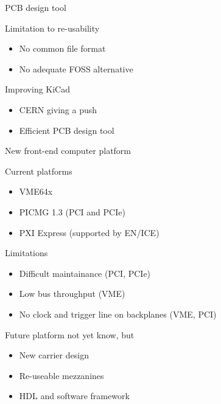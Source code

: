 \documentclass[compress,red]{beamer}
\begin{document}
\begin{frame}{PCB design tool}

  \begin{block}{Limitation to re-usability}
    \begin{itemize}
    \item No common file format
    \item No adequate FOSS alternative
    \end{itemize}
  \end{block}

  \begin{block}{Improving KiCad}
    \begin{itemize}
    \item CERN giving a push
    \item Efficient PCB design tool
    \end{itemize}
  \end{block}


\end{frame}

\begin{frame}{New front-end computer platform}

  \begin{block}{Current platforms}
    \begin{itemize}
    \item VME64x
    \item PICMG 1.3 (PCI and PCIe)
    \item PXI Express (supported by EN/ICE)
    \end{itemize}
  \end{block}

  \begin{block}{Limitations}
    \begin{itemize}
    \item Difficult maintainance (PCI, PCIe)
    \item Low bus throughput (VME)
    \item No clock and trigger line on backplanes (VME, PCI)
    \end{itemize}
  \end{block}


  \begin{block}{Future platform not yet know, but}
    \begin{itemize}
    \item New carrier design
    \item Re-useable mezzanines
    \item HDL and software framework
    \end{itemize}
  \end{block}

\end{frame}
\end{document}
